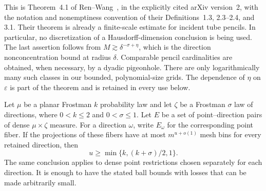 This is Theorem~4.1 of Ren--Wang~\cite{RenWang2023}, in the
explicitly cited arXiv version~2, with the notation and nonemptiness
convention of their Definitions~1.3, 2.3--2.4, and 3.1. Their theorem is already a
finite-scale estimate for incident tube pencils. In particular, no
discretization of a Hausdorff-dimension conclusion is being used. The
last assertion follows from $M\gtrsim\delta^{-\sigma+\eta}$, which is
the direction nonconcentration bound at radius $\delta$. Comparable
pencil cardinalities are obtained, when necessary, by a dyadic
pigeonhole. There are only logarithmically many such classes in our
bounded, polynomial-size grids. The dependence of $\eta$ on
$\varepsilon$ is part of the theorem and is retained in every use below.

\begin{lemma}
\label{proj:projection}
Let $\mu$ be a planar Frostman $k$ probability law and let $\zeta$ be a
Frostman $\sigma$ law of directions, where $0<k\le2$ and
$0<\sigma\le1$. Let $E$ be a set of point--direction pairs of dense
$\mu\times\zeta$ measure. For a direction $\omega$, write $E_\omega$
for the corresponding point fiber. If the projections of these fibers
have at most $m^{u+o(1)}$ mesh bins for every retained direction, then
\begin{equation}
 u\ge \min\{k,(k+\sigma)/2,1\}.
 \label{eq:source-15}
\end{equation}
The same conclusion applies to dense point restrictions chosen
separately for each direction. It is enough to have the stated ball
bounds with losses that can be made arbitrarily small.
\end{lemma}

